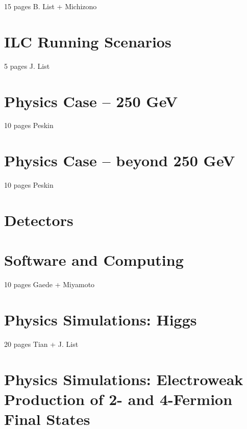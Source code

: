 \documentclass[%
 reprint,
nofootinbib,
 amsmath,amssymb,
 aps,
]{revtex4-1}
\begin{document}
  15 pages B. List + Michizono
  

  
\section{\label{sec:runscenarios}ILC Running Scenarios  }
   5 pages J. List
   

   
   
\section{\label{sec:physics}Physics Case -- 250 GeV }

10 pages Peskin
 


\section{\label{sec:highenergy}Physics Case -- beyond 250 GeV }

10 pages Peskin
 


 
\section{\label{sec:detectors}Detectors }


\section{\label{sec:software}Software and Computing}

   10 pages Gaede + Miyamoto
   
   

\section{\label{sec:higgs}Physics Simulations: Higgs
}


  20 pages Tian + J. List
  
 

\section{\label{sec:ew}Physics Simulations: Electroweak Production of 2- and 4-Fermion Final States }
\end{document}
